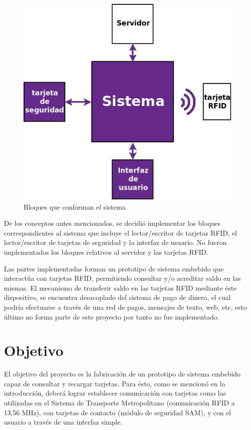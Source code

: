 \documentclass[%
        final,
        notitlepage,
        narroweqnarray,
        inline,
        ]{ieee}
\begin{document}
\begin{figure}[h]
\centering
  \begin{center}
  	\includegraphics[scale=.3]{../pres_fin/Imagenes/diagrama_def.jpg} 
  	\caption{Bloques que conforman el sistema}\label{sist_gral} 
  \end{center}		 
\end{figure}

De los conceptos antes mencionados, se decidió implementar los bloques correspondientes al 
sistema que incluye el lector/escritor de tarjetas RFID, el lector/escritor de tarjetas 
de seguridad y la interfaz de usuario.
No fueron implementados los bloques relativos al servidor y las tarjetas RFID.

\bigskip
Las partes implementadas forman un prototipo de sistema embebido que interactúa con tarjetas RFID,
permitiendo consultar y/o acreditar saldo en las mismas.
El mecanismo de transferir saldo en las tarjetas RFID mediante éste dispositivo, se encuentra
desacoplado del sistema de pago de dinero, el cual podría efectuarse a través de una red de pagos,
mensajes de texto, web, etc, esto último no forma parte de este proyecto por tanto no fue implementado.


\bigskip
\section{Objetivo}
El objetivo del proyecto es la fabricación de un prototipo de sistema embebido capaz de consultar y recargar tarjetas. Para ésto, como se mencionó en la introducción, deberá lograr establecer comunicación con tarjetas  como las utilizadas en el Sistema de Transporte Metropolitano (comunicación RFID a 13,56 MHz), con tarjetas de contacto (módulo de seguridad SAM), y con el usuario a través de una interfaz simple.
\end{document}
